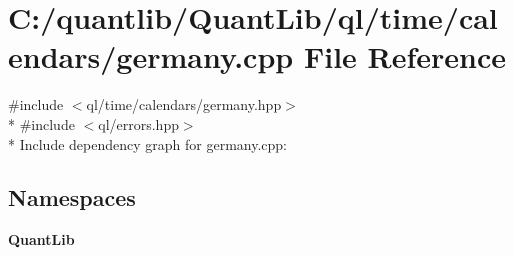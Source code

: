 \section{C\+:/quantlib/\+Quant\+Lib/ql/time/calendars/germany.cpp File Reference}
\label{germany_8cpp}
{\ttfamily \#include $<$ql/time/calendars/germany.\+hpp$>$}\\*
{\ttfamily \#include $<$ql/errors.\+hpp$>$}\\*
Include dependency graph for germany.\+cpp\+:
\subsection*{Namespaces}
\begin{DoxyCompactItemize}
\item 
 {\bf Quant\+Lib}
\end{DoxyCompactItemize}
